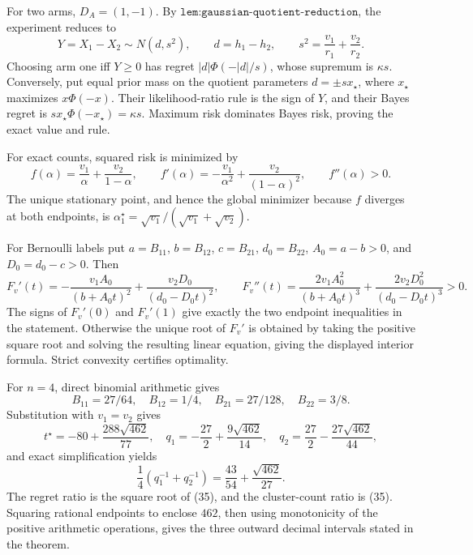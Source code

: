 For two arms, \(D_A=(1,-1)\).  By \(\texttt{lem:gaussian-quotient-reduction}\), the experiment reduces to
\[
 Y=X_1-X_2\sim N(d,s^2),\qquad d=h_1-h_2,\qquad
 s^2=\frac{v_1}{r_1}+\frac{v_2}{r_2}. \tag{33}
\]
Choosing arm one iff \(Y\geq0\) has regret \(|d|\Phi(-|d|/s)\), whose supremum is \(\kappa s\).  Conversely, put equal prior mass on the quotient parameters \(d=\pm sx_\star\), where \(x_\star\) maximizes \(x\Phi(-x)\).  Their likelihood-ratio rule is the sign of \(Y\), and their Bayes regret is \(sx_\star\Phi(-x_\star)=\kappa s\).  Maximum risk dominates Bayes risk, proving the exact value and rule.

For exact counts, squared risk is minimized by
\[
 f(\alpha)=\frac{v_1}{\alpha}+\frac{v_2}{1-\alpha},\qquad
 f'(\alpha)=-\frac{v_1}{\alpha^2}+\frac{v_2}{(1-\alpha)^2},\qquad
 f''(\alpha)>0.
\]
The unique stationary point, and hence the global minimizer because \(f\) diverges at both endpoints, is
\(\alpha_1^\star=\sqrt{v_1}/(\sqrt{v_1}+\sqrt{v_2})\).

For Bernoulli labels put \(a=B_{11}\), \(b=B_{12}\), \(c=B_{21}\), \(d_0=B_{22}\), \(A_0=a-b>0\), and \(D_0=d_0-c>0\).  Then
\[
F_v'(t)=-\frac{v_1A_0}{(b+A_0t)^2}+\frac{v_2D_0}{(d_0-D_0t)^2},\qquad
F_v''(t)=\frac{2v_1A_0^2}{(b+A_0t)^3}+\frac{2v_2D_0^2}{(d_0-D_0t)^3}>0. \tag{34}
\]
The signs of \(F_v'(0)\) and \(F_v'(1)\) give exactly the two endpoint inequalities in the statement.  Otherwise the unique root of \(F_v'\) is obtained by taking the positive square root and solving the resulting linear equation, giving the displayed interior formula.  Strict convexity certifies optimality.

For \(n=4\), direct binomial arithmetic gives
\[
B_{11}=27/64,\quad B_{12}=1/4,\quad B_{21}=27/128,\quad B_{22}=3/8.
\]
Substitution with \(v_1=v_2\) gives
\[
t^\star=-80+\frac{288\sqrt{462}}{77},\quad
q_1=-\frac{27}{2}+\frac{9\sqrt{462}}{14},\quad
q_2=\frac{27}{2}-\frac{27\sqrt{462}}{44},
\]
and exact simplification yields
\[
\frac14(q_1^{-1}+q_2^{-1})=\frac{43}{54}+\frac{\sqrt{462}}{27}. \tag{35}
\]
The regret ratio is the square root of (35), and the cluster-count ratio is (35).  Squaring rational endpoints to enclose \(462\), then using monotonicity of the positive arithmetic operations, gives the three outward decimal intervals stated in the theorem.